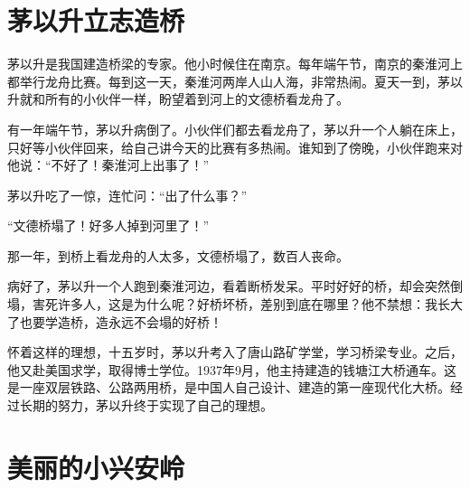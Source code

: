 \documentclass[12pt,UTF-8,openany]{ctexbook}
\begin{document}
\chapter{茅以升立志造桥}

\begin{large}
    
    茅以升是我国建造桥梁的专家。他小时候住在南京。每年端午节，南京的秦淮河上都举行龙舟比赛。每到这一天，秦淮河两岸人山人海，非常热闹。夏天一到，茅以升就和所有的小伙伴一样，盼望着到河上的文德桥看龙舟了。
    
    有一年端午节，茅以升病倒了。小伙伴们都去看龙舟了，茅以升一个人躺在床上，只好等小伙伴回来，给自己讲今天的比赛有多热闹。谁知到了傍晚，小伙伴跑来对他说：“不好了！秦淮河上出事了！”
    
    茅以升吃了一惊，连忙问：“出了什么事？”
    
    “文德桥塌了！好多人掉到河里了！”
    
    那一年，到桥上看龙舟的人太多，文德桥塌了，数百人丧命。
    
    病好了，茅以升一个人跑到秦淮河边，看着断桥发呆。平时好好的桥，却会突然倒塌，害死许多人，这是为什么呢？好桥坏桥，差别到底在哪里？他不禁想：我长大了也要学造桥，造永远不会塌的好桥！
    
    怀着这样的理想，十五岁时，茅以升考入了唐山路矿学堂，学习桥梁专业。之后，他又赴美国求学，取得博士学位。1937年9月，他主持建造的钱塘江大桥通车。这是一座双层铁路、公路两用桥，是中国人自己设计、建造的第一座现代化大桥。经过长期的努力，茅以升终于实现了自己的理想。
    
\end{large}



\chapter{美丽的小兴安岭}
\end{document}
